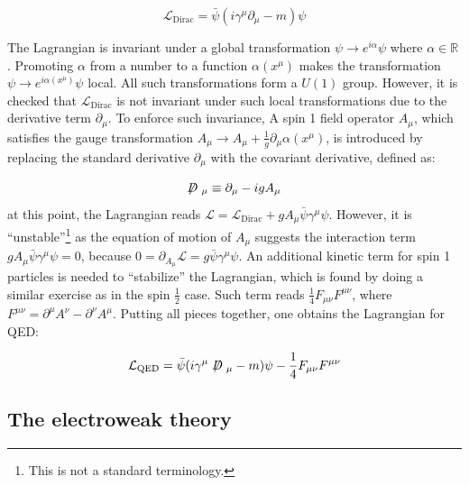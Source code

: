 \begin{equation}
    \mathcal{L}_\text{Dirac} = \bar{\psi} (i\gamma^\mu\partial_\mu - m) \psi
\end{equation}

The Lagrangian is invariant under a global transformation
$\psi \rightarrow e^{i\alpha} \psi$ where $\alpha \in \mathbb{R}$.
Promoting $\alpha$ from a number to a function $\alpha(x^\mu)$
makes the transformation $\psi \rightarrow e^{i\alpha(x^\mu)} \psi$ local.
All such transformations form a $U(1)$ group.
However, it is checked that $\mathcal{L}_\text{Dirac}$ is not invariant
under such local transformations due to the derivative term $\partial_\mu$.
To enforce such invariance,
A spin 1 field operator $A_\mu$,
which satisfies the gauge transformation
$A_\mu \rightarrow A_\mu + \frac{1}{g} \partial_\mu \alpha(x^\mu)$,
is introduced by replacing the standard derivative $\partial_\mu$ with the
covariant derivative, defined as:

\begin{equation}
    \fsl{D}_\mu \equiv \partial_\mu - i g A_\mu
\end{equation}
at this point, the Lagrangian reads
$\mathcal{L} = \mathcal{L}_\text{Dirac} + g A_\mu\bar{\psi}\gamma^\mu\psi$.
However, it is ``unstable''\footnote{
    This is not a standard terminology.
} as the equation of motion of $A_\mu$
suggests the interaction term $g A_\mu\bar{\psi}\gamma^\mu\psi = 0$,
because $0 = \partial_{A_\mu} \mathcal{L} = g \bar{\psi}\gamma^\mu\psi$.
An additional kinetic term for spin 1 particles is needed to ``stabilize'' the
Lagrangian,
which is found by doing a similar exercise as in the spin $\frac{1}{2}$ case.
Such term reads $\frac{1}{4}F_{\mu\nu}F^{\mu\nu}$,
where $F^{\mu\nu} = \partial^\mu A^\nu - \partial^\nu A^\mu$.
Putting all pieces together, one obtains the Lagrangian for QED:

\begin{equation}
    \mathcal{L}_\text{QED} = \bar{\psi} (i\gamma^\mu\fsl{D}_\mu - m) \psi - \frac{1}{4}F_{\mu\nu}F^{\mu\nu}
\end{equation}


\subsection{The electroweak theory}
\label{ew-th}


